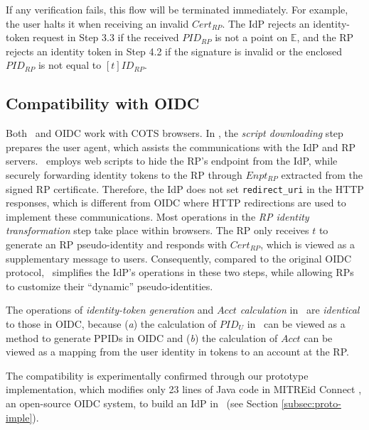 If any verification fails, this flow will be terminated immediately.
For example, the user halts it when receiving an invalid $Cert_{RP}$.
\newc
The IdP rejects an identity-token request in Step 3.3 if the received $PID_{RP}$ is not a point on $\mathbb{E}$, and the RP rejects an identity token in Step 4.2 if the signature is invalid or the enclosed $PID_{RP}$ is not equal to $[t]ID_{RP}$.
\oldc


\subsection{Compatibility with OIDC}
\label{subsec:compatible}

Both \usso\ and OIDC work with COTS browsers. %
In \usso, the \emph{script downloading} step prepares the user agent, which assists the communications with the IdP and RP servers. \usso\ employs web scripts to hide the RP's endpoint from the IdP, while securely forwarding identity tokens to the RP through $Enpt_{RP}$ extracted from the signed RP certificate.
Therefore, the IdP does not set \verb+redirect_uri+ in the HTTP responses, which is different from OIDC where HTTP redirections are used to implement these communications. Most operations in the \emph{RP identity transformation} step take place within browsers. The RP only receives $t$ to generate an RP pseudo-identity and responds with $Cert_{RP}$,
which is viewed as a supplementary message to users.
Consequently, compared to the original OIDC protocol, \usso\ simplifies the IdP's operations in these two steps, while allowing RPs to customize their ``dynamic'' pseudo-identities.

The operations of \emph{identity-token generation} and \emph{$Acct$ calculation} in \usso\ are \emph{identical} to those in OIDC,
 because (\emph{a}) the calculation of $PID_U$ in \usso\ can be viewed as a method to generate PPIDs in OIDC and (\emph{b}) the calculation of $Acct$ can be viewed as a mapping from the user identity in tokens to an account at the RP.

The compatibility is experimentally confirmed through our prototype implementation, which modifies only 23 lines of Java code in MITREid Connect \cite{MITREid}, an open-source OIDC system, to build an IdP in \usso\ (see Section \ref{subsec:proto-imple}).

